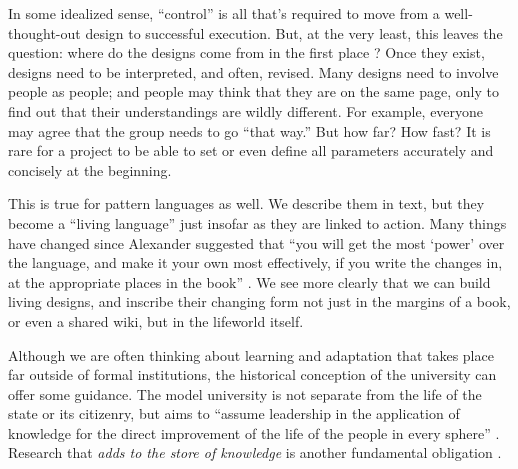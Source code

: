 In some idealized sense, ``control'' is all that's required to move from a well-thought-out design to successful execution.  But, at the very least, this leaves the question: where do the designs come from in the first place \cite{von2003cybernetics}?
%
Once they exist, designs need to be interpreted, and often, revised.  Many designs need to involve people as people; and people may think that they are on the same page, only to find out that their understandings are wildly different.  For  example, everyone may agree that the group needs to go ``that way.''  But how far?  How fast?  It is rare for a project to be able to set or even define all parameters accurately and concisely at the beginning.

This is true for pattern languages as well.  We describe them in text, but they become a ``living language'' \cite[p.~xvii]{alexander1977pattern}  just insofar as they are linked to action.  Many things have changed since Alexander suggested that ``you will get the most `power' over the language, and make it your own most effectively, if you write the changes in, at the appropriate places in the book'' \cite[p.~xl]{alexander1977pattern}.  We see more clearly that we can build living designs, and inscribe their changing form not just in the margins of a book, or even a shared wiki, but in the lifeworld itself.  

Although we are often thinking about learning and adaptation that takes
place far outside of formal institutions, the historical conception
of the university can offer some guidance.
%
The model university is not separate from the life of the state or its
citizenry, but aims to ``assume leadership in the application of
knowledge for the direct improvement of the life of the people in
every sphere'' \cite[p.~88]{curti1949university}. Research that \emph{adds
to the store of knowledge} is another fundamental
obligation \cite[p.~550]{curti1949university}.    


